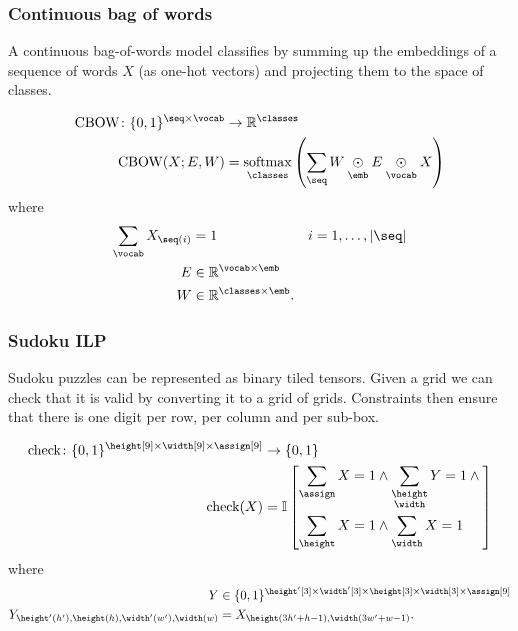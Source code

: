 \documentclass{article}
\newcommand{\reals}{\mathbb{R}}
\begin{document}
\subsubsection{Continuous bag of words}

A continuous bag-of-words model classifies by summing up the embeddings of a sequence of words $X$ (as one-hot vectors) and projecting them to the space of classes. 

\begin{align*}
\text{CBOW} \colon \{0, 1\}^{\seq \times \vocab} &\rightarrow \reals^{\classes} \\
\text{CBOW}(X; E, W) &= \nfun{\classes}{softmax} \left(\nsum{\seq} W \ndot{\emb} E \ndot{\vocab} X\right)
\end{align*}
where
\begin{align*}
\nsum{\vocab} X_{\seq(i)} &= 1 & i &= 1, \ldots, |\seq| \\
E &\in \reals^{\vocab \times \emb} \\
W &\in \reals^{\classes \times \emb}.
\end{align*}

\subsubsection{Sudoku ILP}


Sudoku puzzles can be represented as  binary tiled tensors.
Given a grid we can check that it is valid by converting it to a grid of grids. 
Constraints then ensure that there is one digit per row, per column and per sub-box.

\begin{align*}
\text{check} \colon \{0, 1\}^{\height[9] \times \width[9] \times \assign[9]} &\rightarrow \{0, 1\} \\
\text{check}(X) &=
\mathbb{I}\left[\begin{aligned}
\nsum{\assign} X = 1 &\land \nsum{\height \\ \width} Y = 1 \land {} \\
\nsum{\height} X = 1 &\land \nsum{\width} X = 1
\end{aligned}\right]
\end{align*}
where
\begin{align*}
Y &\in \{0, 1\}^{\height'[3] \times \width'[3] \times \height[3] \times \width[3] \times \assign[9]}  \\
Y_{\height'(h'), \height(h), \width'(w'), \width(w)} &= X_{\height(3h' + h-1), \width(3 w' + w-1)}.
\end{align*} 
\end{document}
